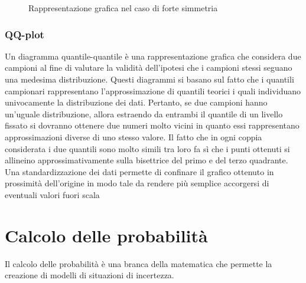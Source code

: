 \begin{figure}[h]
    \centering
    \caption{Rappresentazione grafica nel caso di forte simmetria}
    \label{fig:forte_simmetria}
    \vspace{\abovedisplayskip}
\end{figure}

\subsubsection{QQ-plot}
Un diagramma quantile-quantile è una rappresentazione grafica che considera due campioni al fine di valutare la validità dell’ipotesi che i campioni stessi seguano una medesima distribuzione. Questi diagrammi si basano sul fatto che i quantili campionari rappresentano l’approssimazione di quantili teorici i quali individuano univocamente la distribuzione dei dati. Pertanto, se due campioni hanno un’uguale distribuzione, allora estraendo da entrambi il quantile di un livello fissato si dovranno ottenere due numeri molto vicini in quanto essi rappresentano approssimazioni diverse di uno stesso valore. Il fatto che in ogni coppia considerata i due quantili sono molto simili tra loro fa sì che i punti ottenuti si allineino approssimativamente sulla bisettrice del primo e del terzo quadrante.
\newline \newline
Una standardizzazione dei dati permette di confinare il grafico ottenuto in prossimità dell'origine in modo tale da rendere più semplice accorgersi di eventuali valori fuori scala

\newpage
\section{Calcolo delle probabilità}
Il calcolo delle probabilità è una branca della matematica che permette la creazione di modelli di situazioni di incertezza.

